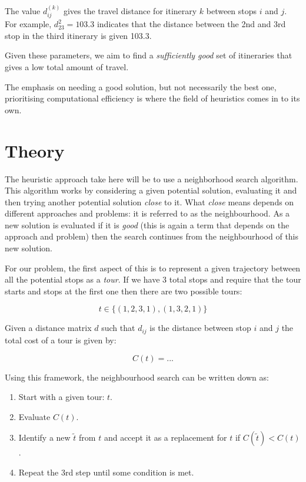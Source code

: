 The value \(d^{(k)}_{ij}\) gives the travel distance for itinerary \(k\) between
stops \(i\) and \(j\). For example, \(d^{2}_{23}=103.3\) %
indicates that the distance between the 2nd and 3rd stop in the third itinerary
is given 103.3. %

Given these parameters, we aim to find a \emph{sufficiently good} set of
itineraries that gives a low total amount of travel.

The emphasis on needing a good solution, but not necessarily the best one,
prioritising computational efficiency is where the field of heuristics comes in
to its own.

\section{Theory}\label{sec:theory}

The heuristic approach take here will be to use a neighborhood search algorithm.
This algorithm works by considering a given potential solution, evaluating it
and then trying another potential solution \emph{close} to it. What \emph{close}
means depends on different approaches and problems: it is referred to as the
neighbourhood. As a new solution is evaluated if it is \emph{good} (this is
again a term that depends on the approach and problem) then the search
continues from the neighbourhood of this new solution.

For our problem,
the first aspect of this is to represent a given trajectory between all the
potential stops as a \emph{tour}. If we have 3 total stops and require that the
tour starts and stops at the first one then there are two possible tours:

\[
    t \in \{(1, 2, 3, 1), (1, 3, 2, 1)\}
\]

Given a distance matrix \(d\) such that \(d_{ij}\) is the distance between stop
\(i\) and \(j\) the total cost of a tour is given by:

\[
    C(t)=...  %
\]


Using this framework, the neighbourhood search can be written down as:

\begin{enumerate}
    \item Start with a given tour: \(t\).
    \item Evaluate \(C(t)\).
    \item Identify a new \(\tilde t\) from \(t\) and accept it as a replacement
        for \(t\) if \(C(\tilde t)<
        C(t)\).
    \item Repeat the 3rd step until some condition is met.
\end{enumerate}

